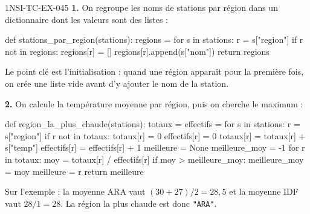 \begin{corrige}{1NSI-TC-EX-045}
\textbf{1.} On regroupe les noms de stations par région dans un dictionnaire dont les valeurs sont des listes :

\begin{python}
def stations_par_region(stations):
    regions = {}
    for s in stations:
        r = s["region"]
        if r not in regions:
            regions[r] = []
        regions[r].append(s["nom"])
    return regions
\end{python}

Le point clé est l'initialisation : quand une région apparaît pour la première fois, on crée une liste vide avant d'y ajouter le nom de la station.

\textbf{2.} On calcule la température moyenne par région, puis on cherche le maximum :

\begin{python}
def region_la_plus_chaude(stations):
    totaux = {}
    effectifs = {}
    for s in stations:
        r = s["region"]
        if r not in totaux:
            totaux[r] = 0
            effectifs[r] = 0
        totaux[r] = totaux[r] + s["temp"]
        effectifs[r] = effectifs[r] + 1
    meilleure = None
    meilleure_moy = -1
    for r in totaux:
        moy = totaux[r] / effectifs[r]
        if moy > meilleure_moy:
            meilleure_moy = moy
            meilleure = r
    return meilleure
\end{python}

Sur l'exemple : la moyenne ARA vaut $(30 + 27) / 2 = 28{,}5$ et la moyenne IDF vaut $28 / 1 = 28$. La région la plus chaude est donc \lstinline{"ARA"}.
\end{corrige}
